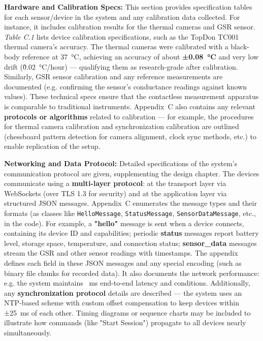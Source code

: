 \textbf{Hardware and Calibration Specs:} This section provides specification
tables for each sensor/device in the system and any calibration data
collected. For instance, it includes calibration results for the thermal
cameras and GSR sensor. \textit{Table C.1} lists device calibration
specifications, such as the TopDon TC001 thermal camera's accuracy. The
thermal cameras were calibrated with a black-body reference at 37 °C,
achieving an accuracy of about \textbf{±0.08 °C} and very low drift
(\~0.02 °C/hour) --- qualifying them as research-grade after
calibration\cite{InstantStressSmartphone2019}.
Similarly, GSR sensor calibration and any reference measurements are
documented (e.g. confirming the sensor's conductance readings against
known values). These technical specs ensure that the contactless
measurement apparatus is comparable to traditional instruments.
Appendix C also contains any relevant \textbf{protocols or algorithms}
related to calibration --- for example, the procedures for thermal camera
calibration and synchronization calibration are outlined (chessboard
pattern detection for camera alignment, clock sync methods, etc.) to
enable replication of the
setup\cite{InstantStressSmartphone2019}\cite{GSRPPGMachineLearning2024}.

\textbf{Networking and Data Protocol:} Detailed specifications of the
system's communication protocol are given, supplementing the design
chapter. The devices communicate using a \textbf{multi-layer protocol}: at
the transport layer via WebSockets (over TLS 1.3 for security) and at
the application layer via structured JSON
messages\cite{AppleHealthWatch2019}.
Appendix C enumerates the message types and their formats (as classes
like \texttt{HelloMessage}, \texttt{StatusMessage}, \texttt{SensorDataMessage}, etc., in the
code). For example, a \textbf{"hello"} message is sent when a device
connects, containing its device ID and capabilities; periodic \textbf{status}
messages report battery level, storage space, temperature, and
connection status; \textbf{sensor_data} messages stream the GSR and other
sensor readings with
timestamps\cite{GSRPPGMachineLearning2024}\cite{GSRPPGMachineLearning2024}.
The appendix defines each field in these JSON messages and any special
encoding (such as binary file chunks for recorded data). It also
documents the network performance: e.g. the system maintains  ms
end-to-end latency and %
conditions\cite{AppleHealthWatch2019}.
Additionally, any \textbf{synchronization protocol} details are described ---
the system uses an NTP-based scheme with custom offset compensation to
keep devices within ±25 ms of each
other\cite{TopdonTC001}.
Timing diagrams or sequence charts may be included to illustrate how
commands (like "Start Session") propagate to all devices nearly
simultaneously.

